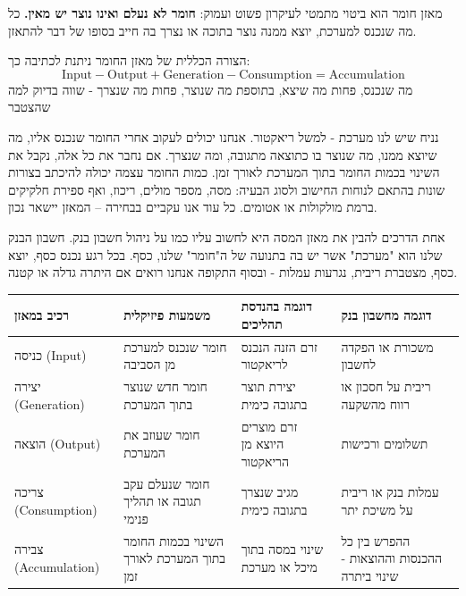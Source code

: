 \documentclass[
  hebrew,
  letterpaper,
  DIV=11,
  numbers=noendperiod]{scrreprt}
\begin{document}
מאזן חומר הוא ביטוי מתמטי לעיקרון פשוט ועמוק: \textbf{חומר לא נעלם ואינו
נוצר יש מאין.} כל מה שנכנס למערכת, יוצא ממנה נוצר בתוכה או נצרך בה חייב
בסופו של דבר להתאזן.

הצורה הכללית של מאזן החומר ניתנת לכתיבה כך:
\[\text{Input} - \text{Output} + \text{Generation} - \text{Consumption} = \text{Accumulation}\]
מה שנכנס, פחות מה שיצא, בתוספת מה שנוצר, פחות מה שנצרך - שווה בדיוק למה
שהצטבר

נניח שיש לנו מערכת - למשל ריאקטור. אנחנו יכולים לעקוב אחרי החומר שנכנס
אליו, מה שיוצא ממנו, מה שנוצר בו כתוצאה מתגובה, ומה שנצרך. אם נחבר את כל
אלה, נקבל את השינוי בכמות החומר בתוך המערכת לאורך זמן. כמות החומר עצמה
יכולה להיכתב בצורות שונות בהתאם לנוחות החישוב ולסוג הבעיה: מסה, מספר
מולים, ריכוז, ואף ספירת חלקיקים ברמת מולקולות או אטומים. כל עוד אנו
עקביים בבחירה -- המאזן יישאר נכון.

אחת הדרכים להבין את מאזן המסה היא לחשוב עליו כמו על ניהול חשבון בנק.
חשבון הבנק שלנו הוא "מערכת" אשר יש בה בתנועה של ה"חומר" שלנו, כסף. בכל
רגע נכנס כסף, יוצא כסף, מצטברת ריבית, נגרעות עמלות - ובסוף התקופה אנחנו
רואים אם היתרה גדלה או קטנה.

\begin{longtable}[]{@{}
  >{\raggedright\arraybackslash}p{}
  >{\raggedright\arraybackslash}p{}
  >{\raggedright\arraybackslash}p{}
  >{\raggedright\arraybackslash}p{}@{}}
\toprule\noalign{}
\begin{minipage}[b]{\linewidth}\raggedright
רכיב במאזן
\end{minipage} & \begin{minipage}[b]{\linewidth}\raggedright
משמעות פיזיקלית
\end{minipage} & \begin{minipage}[b]{\linewidth}\raggedright
דוגמה בהנדסת תהליכים
\end{minipage} & \begin{minipage}[b]{\linewidth}\raggedright
דוגמה מחשבון בנק
\end{minipage} \\
\midrule\noalign{}
\endhead
\bottomrule\noalign{}
\endlastfoot
כניסה (Input) & חומר שנכנס למערכת מן הסביבה & זרם הזנה הנכנס לריאקטור &
משכורת או הפקדה לחשבון \\
יצירה (Generation) & חומר חדש שנוצר בתוך המערכת & יצירת תוצר בתגובה
כימית & ריבית על חסכון או רווח מהשקעה \\
הוצאה (Output) & חומר שעוזב את המערכת & זרם מוצרים היוצא מן הריאקטור &
תשלומים ורכישות \\
צריכה (Consumption) & חומר שנעלם עקב תגובה או תהליך פנימי & מגיב שנצרך
בתגובה כימית & עמלות בנק או ריבית על משיכת יתר \\
צבירה (Accumulation) & השינוי בכמות החומר בתוך המערכת לאורך זמן & שינוי
במסה בתוך מיכל או מערכת & ההפרש בין כל ההכנסות וההוצאות - שינוי ביתרה \\
\end{longtable}
\end{document}
